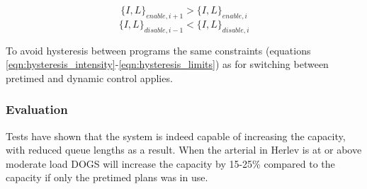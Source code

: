 $$\lbrace I,L \rbrace_{enable,i+1} > \lbrace I,L \rbrace_{enable,i}$$
$$\lbrace I,L \rbrace_{disable,i-1} < \lbrace I,L \rbrace_{disable,i}$$

To avoid hysteresis between programs the same constraints (equations \ref{eqn:hysteresis_intensity}-\ref{eqn:hysteresis_limits}) as for switching between pretimed and dynamic control applies.

\subsubsection*{Evaluation}

Tests have shown that the system is indeed capable of increasing the
capacity, with reduced queue lengths as a result. When the arterial in
Herlev is at or above moderate load DOGS will increase the capacity by
15-25\% compared to the capacity if only the pretimed plans was in
use.
